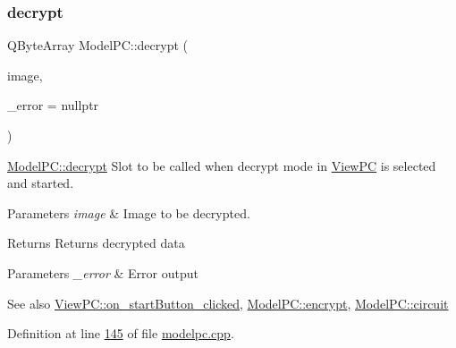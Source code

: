 \subsubsection{\texorpdfstring{decrypt}{decrypt}}
{\footnotesize\ttfamily Q\+Byte\+Array Model\+P\+C\+::decrypt (\begin{DoxyParamCaption}\item[{Q\+Image $\ast$}]{image,  }\item[{Q\+String $\ast$}]{\+\_\+error = {\ttfamily nullptr} }\end{DoxyParamCaption})\hspace{0.3cm}{\ttfamily [slot]}}



\mbox{\hyperlink{class_model_p_c_af1f0b21565bf39808c4cdd448fad0ea8}{Model\+P\+C\+::decrypt}} Slot to be called when decrypt mode in \mbox{\hyperlink{class_view_p_c}{View\+PC}} is selected and started. 


\begin{DoxyParams}{Parameters}
{\em image} & Image to be decrypted. \\
\hline
\end{DoxyParams}
\begin{DoxyReturn}{Returns}
Returns decrypted data 
\end{DoxyReturn}

\begin{DoxyParams}{Parameters}
{\em \+\_\+error} & Error output \\
\hline
\end{DoxyParams}
\begin{DoxySeeAlso}{See also}
\mbox{\hyperlink{class_view_p_c_a456d75b7c5d3a089302a576e7359f1f4}{View\+P\+C\+::on\+\_\+start\+Button\+\_\+clicked}}, \mbox{\hyperlink{class_model_p_c_a8ef76567bc0c0307b4e2547c46536e51}{Model\+P\+C\+::encrypt}}, \mbox{\hyperlink{class_model_p_c_a1d0091062a0c836b283ec2f67411623b}{Model\+P\+C\+::circuit}} 
\end{DoxySeeAlso}


Definition at line \mbox{\hyperlink{modelpc_8cpp_source_l00145}{145}} of file \mbox{\hyperlink{modelpc_8cpp_source}{modelpc.\+cpp}}.

